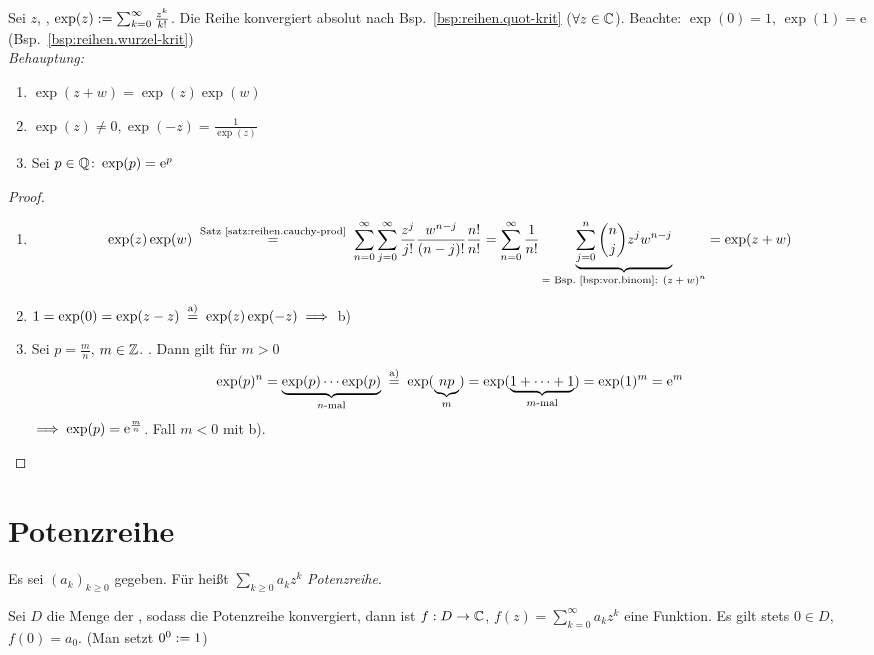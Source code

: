 \documentclass[12pt]{scrreprt}
\begin{document}
\begin{bsp}[Exponentialreihe]\label{bsp:reihen.expon-reihe}
Sei $z$, , $\exp(z) := \sum_{k=0}^\infty \frac{z^k}{k!}$.
Die Reihe konvergiert absolut nach Bsp.~\ref{bsp:reihen.quot-krit} ($\forall z\in\mathbb{C}$).
Beachte: $\exp(0) = 1$, $\exp(1) = \mathrm{e}$ (Bsp.~\ref{bsp:reihen.wurzel-krit})\\

\noindent\emph{Behauptung:}
\begin{enumerate}
\item $\exp(z+w) = \exp(z)\exp(w)$\label{bsp:reihen.expon-reihe.a}
\item $\exp(z) \neq 0, \exp(-z) = \frac{1}{\exp(z)}$\label{bsp:reihen.expon-reihe.b}
\item Sei $p\in\mathbb{Q}\colon\exp(p) = \mathrm{e}^p$\label{bsp:reihen.expon-reihe.c}
\end{enumerate}
\end{bsp}
\begin{proof}
\begin{enumerate}
\item \[\exp(z)\exp(w) \nach{=}{Satz~\ref{satz:reihen.cauchy-prod}} \sum_{n=0}^\infty\sum_{j=0}^\infty \frac{z^j}{j!} \frac{w^{n-j}}{(n-j)!} \frac{n!}{n!}
= \sum_{n=0}^\infty \frac{1}{n!} \underbrace{\sum_{j=0}^n \binom{n}{j}z^j w^{n-j}}_{\text{= Bsp.~\ref{bsp:vor.binom}: $(z+w)^n$}} 
= \exp(z+w)\]
\item $1 = \exp(0) = \exp(z-z) \nach{=}{a)} \exp(z)\exp(-z) \folgt$ b)
\item Sei $p = \frac{m}{n}$, $m\in\mathbb{Z}$. . Dann gilt für $m > 0$ 
\[\exp(p)^n = \underbrace{\exp(p)\dotsm\exp(p)}_{\text{$n$-mal}} \nach{=}{a)} \exp(\underbrace{np}_m)
= \exp(\underbrace{1+\dotsb+1}_{\text{$m$-mal}}) = \exp(1)^m =\mathrm{e}^m\]
$\implies \exp(p) = \mathrm{e}^{\frac{m}{n}}$. Fall $m < 0$ mit b).
\end{enumerate}
\end{proof}

\section{Potenzreihe}
\label{sec:reihen.potenzreihe}
\begin{dfn}\label{dfn:reihen.potenzreihe}
Es sei $(a_k)_{k\ge 0}$ gegeben. Für  heißt $\sum_{k\ge 0} a_kz^k$ \emph{Potenzreihe}.
\end{dfn}

\begin{bem*}
Sei $D$ die Menge der , sodass die Potenzreihe konvergiert, dann ist 
$f: D \rightarrow \mathbb{C}$, $f(z) = \sum_{k=0}^\infty a_kz^k$ eine Funktion. Es gilt stets
$0\in D$, $f(0)=a_0$. (Man setzt $0^0 := 1$)
\end{bem*}
\end{document}
